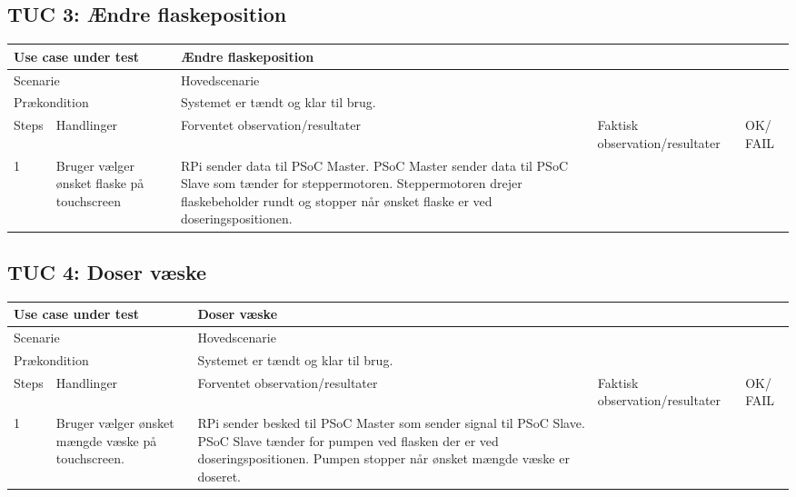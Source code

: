 \subsection{TUC 3: Ændre flaskeposition}

\begin{table}[H]
\begin{tabular}{|p{1cm}|p{4cm}|p{4cm}|p{4cm}|p{1cm}|}
\hline
\multicolumn{2}{|p{5cm}|}{Use case under test} & \multicolumn{3}{p{9cm}|}{Ændre flaskeposition}                                       \\ \hline
\multicolumn{2}{|p{5cm}|}{Scenarie}            & \multicolumn{3}{p{9cm}|}{Hovedscenarie}                                          \\ \hline
\multicolumn{2}{|p{5cm}|}{Prækondition}        & \multicolumn{3}{p{9cm}|}{Systemet er tændt og klar til brug.}                                 \\ \hline
Steps               & Handlinger          & Forventet observation/resultater & Faktisk observation/resultater & OK/ FAIL \\ \hline
1    & Bruger vælger ønsket flaske på touchscreen  &  RPi sender data til PSoC Master. PSoC Master sender data til PSoC Slave som tænder for steppermotoren. Steppermotoren drejer flaskebeholder rundt og stopper når ønsket flaske er ved doseringspositionen. &   &         \\ \hline

\end{tabular}
\end{table}

\subsection{TUC 4: Doser væske}

\begin{table}[H]
\begin{tabular}{|p{1cm}|p{4cm}|p{4cm}|p{4cm}|p{1cm}|}
\hline
\multicolumn{2}{|p{5cm}|}{Use case under test} & \multicolumn{3}{p{9cm}|}{Doser væske}                                       \\ \hline
\multicolumn{2}{|p{5cm}|}{Scenarie}            & \multicolumn{3}{p{9cm}|}{Hovedscenarie}                                          \\ \hline
\multicolumn{2}{|p{5cm}|}{Prækondition}        & \multicolumn{3}{p{9cm}|}{Systemet er tændt og klar til brug.}                                 \\ \hline
Steps               & Handlinger          & Forventet observation/resultater & Faktisk observation/resultater & OK/ FAIL \\ \hline
1    & Bruger vælger ønsket mængde væske på touchscreen.  &  RPi sender besked til PSoC Master som sender signal til PSoC Slave. PSoC Slave tænder for pumpen ved flasken der er ved doseringspositionen. Pumpen stopper når ønsket mængde væske er doseret. &   &         \\ \hline

\end{tabular}
\end{table}


